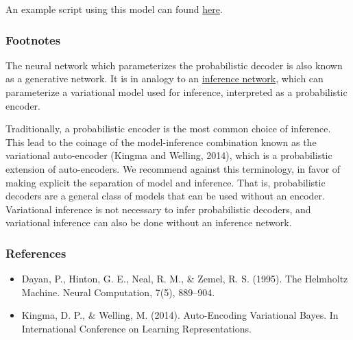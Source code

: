 An example script using this model can found
\href{https://github.com/blei-lab/edward/blob/master/examples/vae.py}
{here}.

\subsubsection{Footnotes}

The neural network which parameterizes the probabilistic decoder is
also known as a generative network. It is in analogy to an
\href{tut_inference_networks.html}{inference network}, which
can parameterize a variational model used for inference,
interpreted as a probabilistic encoder.

Traditionally, a probabilistic encoder is the most common
choice of inference. This lead to the coinage of the model-inference
combination known as the variational auto-encoder
(Kingma and Welling, 2014), which is a probabilistic extension of
auto-encoders.
We recommend against this terminology,
in favor of making explicit the separation of model and inference.
That is, probabilistic decoders are a general class of
models that can be used without an encoder.
Variational
inference is not necessary to infer probabilistic decoders, and
variational inference can also be done without an inference network.

\subsubsection{References}\label{references}

\begin{itemize}
\item
  Dayan, P., Hinton, G. E., Neal, R. M., & Zemel, R. S. (1995). The Helmholtz Machine. Neural Computation, 7(5), 889–904.
\item
  Kingma, D. P., & Welling, M. (2014). Auto-Encoding Variational Bayes. In International Conference on Learning Representations.
\end{itemize}
